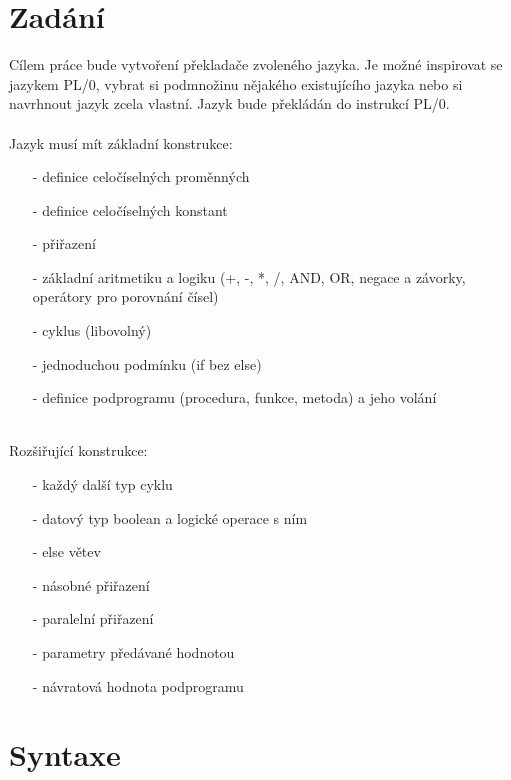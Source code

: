 \documentclass[12pt]{report}
\begin{document}
\chapter{Zadání}
Cílem práce bude vytvoření překladače zvoleného jazyka. Je možné inspirovat se jazykem PL/0, vybrat si podmnožinu nějakého existujícího jazyka nebo si navrhnout jazyk zcela vlastní. Jazyk bude překládán do instrukcí PL/0. 
\\
\\
Jazyk musí mít základní konstrukce:
\begin{itemize}[noitemsep]
	\item [-] definice celočíselných proměnných
	\item [-] definice celočíselných konstant
	\item [-] přiřazení
	\item [-] základní aritmetiku a logiku (+, -, *, /, AND, OR, negace a závorky, operátory pro porovnání čísel)
	\item [-] cyklus (libovolný)
	\item [-] jednoduchou podmínku (if bez else)
	\item [-] definice podprogramu (procedura, funkce, metoda) a jeho volání
\end{itemize}
\ \\
Rozšiřující konstrukce:
\begin{itemize}[noitemsep]
	\item [-] každý další typ cyklu
	\item [-] datový typ boolean a logické operace s ním
	\item [-] else větev
	\item [-] násobné přiřazení
	\item [-] paralelní přiřazení
	\item [-] parametry předávané hodnotou
	\item [-] návratová hodnota podprogramu
\end{itemize}

\chapter{Syntaxe}
\end{document}
